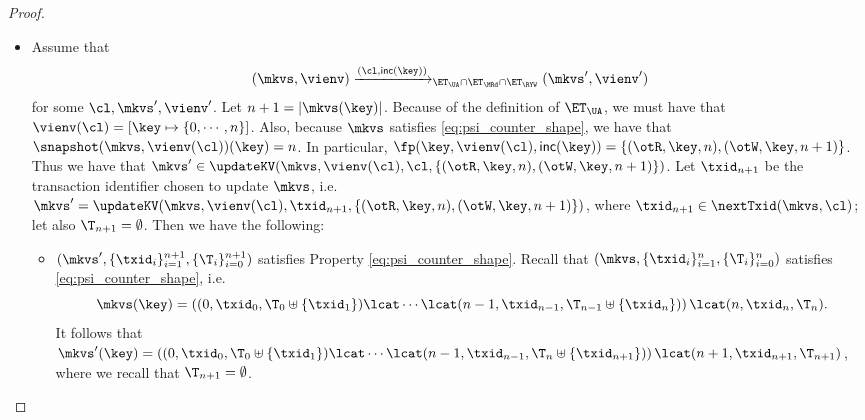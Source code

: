 \begin{proof}
\begin{itemize}
\item 
Assume that
\[
(\mkvs, \vienv) \xrightarrow{(\cl, \mathsf{inc}(\key))}_{\ET_{\UA} \cap \ET_{\MRd} \cap  \ET_{\RYW}} (\mkvs', \vienv')
\]
for some $\cl, \mkvs', \vienv'$. Let $n+1 = \lvert \mkvs(\key) \rvert$. Because of the definition of 
$\ET_{\UA}$, we must have that $\vienv(\cl) = [\key \mapsto \{0, \cdots, n\}]$. Also, 
because $\mkvs$ satisfies \eqref{eq:psi_counter_shape}, we have that $\snapshot(\mkvs, \vienv(\cl))(\key) = n$. 
In particular, $\fp(\key, \vienv(\cl), \mathsf{inc}(\key)) = \{(\otR, \key, n), (\otW, \key, n+1)\}$. 
Thus we have that $\mkvs' \in \updateKV(\mkvs, \vienv(\cl), \cl, \{(\otR, \key, n), (\otW, \key, n+1)\})$. 
Let $\txid_{n+1}$ be the transaction identifier 
chosen to update $\mkvs$, i.e. $\mkvs' = \updateKV(\mkvs, \vienv(\cl), \txid_{n+1}, \{(\otR, \key, n), (\otW, \key, n+1)\})$, 
where $\txid_{n+1} \in \nextTxid(\mkvs, \cl)$; 
let also $\T_{n+1} = \emptyset$. Then we have the following: 
\begin{itemize}
\item  $(\mkvs', \{\txid_{i}\}_{i=1}^{n+1}, \{\T_{i}\}_{i=0}^{n+1})$ satisfies Property \eqref{eq:psi_counter_shape}. 
Recall that $(\mkvs, \{\txid_{i}\}_{i=1}^{n}, \{\T_{i}\}_{i=0}^{n})$ satisfies \eqref{eq:psi_counter_shape}, 
i.e.
\[\mkvs(\key) = \left( (0, \txid_{0}, \T_{0} \uplus \{\txid_1\}) \lcat \cdots \lcat (n-1, \txid_{n-1}, \T_{n-1} \uplus \{\txid_{n}\}) \right) 
\lcat (n, \txid_{n}, \T_{n}).
\]
It follows that $\mkvs'(\key) = \left( (0, \txid_{0}, \T_{0} \uplus \{\txid_1\}) \lcat \cdots \lcat (n-1, \txid_{n-1}, \T_{n} \uplus \{\txid_{n+1}\}) \right) 
\lcat (n+1, \txid_{n+1}, \T_{n+1})$, 
where we recall that $\T_{n+1} = \emptyset$.


\end{itemize}
\end{itemize}
\end{proof}
